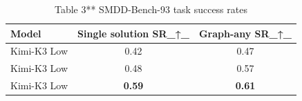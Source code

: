 \begin{table}[t]
\centering
\caption{Table 3** SMDD-Bench-93 task success rates}
\label{tab:2609.34491}
\begin{tabular}{lcc}
\toprule
Model & Single solution SR\_↑\_ & Graph-any SR\_↑\_ \\
\midrule
Kimi-K3 Low & 0.42 & 0.47 \\
Kimi-K3 Low & 0.48 & 0.57 \\
Kimi-K3 Low & \textbf{0.59} & \textbf{0.61} \\
\bottomrule
\end{tabular}
\end{table}
